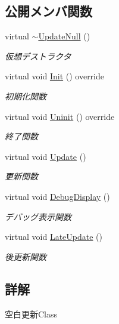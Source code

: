 \subsection*{公開メンバ関数}
\begin{DoxyCompactItemize}
\item 
virtual \mbox{\hyperlink{class_update_null_a121a3045119935eb2704ef282bba2f9f}{$\sim$\+Update\+Null}} ()
\begin{DoxyCompactList}\small\item\em 仮想デストラクタ \end{DoxyCompactList}\item 
virtual void \mbox{\hyperlink{class_update_null_abe9bc57c7932d2de47073c2709007432}{Init}} () override
\begin{DoxyCompactList}\small\item\em 初期化関数 \end{DoxyCompactList}\item 
virtual void \mbox{\hyperlink{class_update_null_a5bd107431c5039abe13c966edb047375}{Uninit}} () override
\begin{DoxyCompactList}\small\item\em 終了関数 \end{DoxyCompactList}\item 
virtual void \mbox{\hyperlink{class_update_null_a692f4f34e4ef35ca286a1d3606fdf473}{Update}} ()
\begin{DoxyCompactList}\small\item\em 更新関数 \end{DoxyCompactList}\item 
virtual void \mbox{\hyperlink{class_update_null_a77aee1e614cf6dafe4f9af58b2205e4b}{Debug\+Display}} ()
\begin{DoxyCompactList}\small\item\em デバッグ表示関数 \end{DoxyCompactList}\item 
virtual void \mbox{\hyperlink{class_update_null_ac68da1ba7f3fbcae833442bb1c169200}{Late\+Update}} ()
\begin{DoxyCompactList}\small\item\em 後更新関数 \end{DoxyCompactList}\end{DoxyCompactItemize}


\subsection{詳解}
空白更新\+Class 

